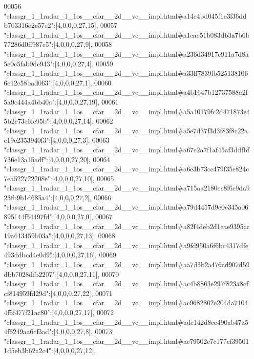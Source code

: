\begin{DoxyCode}
00056 \textcolor{stringliteral}{"classgr\_1\_1radar\_1\_1os\_\_cfar\_\_2d\_\_vc\_\_impl.html#a14e4bd045f1e3f36ddb703316e2e57e2"}:[4,0,0,0,27,15],
00057 \textcolor{stringliteral}{"classgr\_1\_1radar\_1\_1os\_\_cfar\_\_2d\_\_vc\_\_impl.html#a1cae51b083db3a7b6b77286d0ff987c5"}:[4,0,0,0,27,9],
00058 \textcolor{stringliteral}{"classgr\_1\_1radar\_1\_1os\_\_cfar\_\_2d\_\_vc\_\_impl.html#a236d34917c911a7d8a5e0c5fab9dc943"}:[4,0,0,0,27,4],
00059 \textcolor{stringliteral}{"classgr\_1\_1radar\_1\_1os\_\_cfar\_\_2d\_\_vc\_\_impl.html#a33ff7839fb5251381066e12e58bad063"}:[4,0,0,0,27,1],
00060 \textcolor{stringliteral}{"classgr\_1\_1radar\_1\_1os\_\_cfar\_\_2d\_\_vc\_\_impl.html#a4b1647b12737588a2f5a9c444a4bb40a"}:[4,0,0,0,27,19],
00061 \textcolor{stringliteral}{"classgr\_1\_1radar\_1\_1os\_\_cfar\_\_2d\_\_vc\_\_impl.html#a5a10179fc2d471873e45b2e73c6fc95b"}:[4,0,0,0,27,14],
00062 \textcolor{stringliteral}{"classgr\_1\_1radar\_1\_1os\_\_cfar\_\_2d\_\_vc\_\_impl.html#a5e7d37f3d3f83f8c22ac19e2353940f3"}:[4,0,0,0,27,3],
00063 \textcolor{stringliteral}{"classgr\_1\_1radar\_1\_1os\_\_cfar\_\_2d\_\_vc\_\_impl.html#a67e2a7f1af45af3ddfbf736e13a15adf"}:[4,0,0,0,27,20],
00064 \textcolor{stringliteral}{"classgr\_1\_1radar\_1\_1os\_\_cfar\_\_2d\_\_vc\_\_impl.html#a6e3b73cc479f35e824c7ea522722208e"}:[4,0,0,0,27,10],
00065 \textcolor{stringliteral}{"classgr\_1\_1radar\_1\_1os\_\_cfar\_\_2d\_\_vc\_\_impl.html#a715aa2180ec8f6c9da923fb9b1d685a4"}:[4,0,0,0,27,2],
00066 \textcolor{stringliteral}{"classgr\_1\_1radar\_1\_1os\_\_cfar\_\_2d\_\_vc\_\_impl.html#a79d4457d9c0e345a06895144f54497fd"}:[4,0,0,0,27,0],
00067 \textcolor{stringliteral}{"classgr\_1\_1radar\_1\_1os\_\_cfar\_\_2d\_\_vc\_\_impl.html#a82f4deb2d1eae9395cc19a613459b03a"}:[4,0,0,0,27,13],
00068 \textcolor{stringliteral}{"classgr\_1\_1radar\_1\_1os\_\_cfar\_\_2d\_\_vc\_\_impl.html#a9fd950a6f6bc4317dfe493ddbcd4e0d9"}:[4,0,0,0,27,16],
00069 \textcolor{stringliteral}{"classgr\_1\_1radar\_1\_1os\_\_cfar\_\_2d\_\_vc\_\_impl.html#aa7d3b2a476cd907d59dbb7028dfb2207"}:[4,0,0,0,27,11],
00070 \textcolor{stringliteral}{"classgr\_1\_1radar\_1\_1os\_\_cfar\_\_2d\_\_vc\_\_impl.html#ac4b8863e297f823a8cfcf814959fd29d"}:[4,0,0,0,27,22],
00071 \textcolor{stringliteral}{"classgr\_1\_1radar\_1\_1os\_\_cfar\_\_2d\_\_vc\_\_impl.html#ac9682802e204da71044f5f477f21ac80"}:[4,0,0,0,27,17],
00072 \textcolor{stringliteral}{"classgr\_1\_1radar\_1\_1os\_\_cfar\_\_2d\_\_vc\_\_impl.html#ade142d8ce490ab47a54f6249aa6cf3ad"}:[4,0,0,0,27,8],
00073 \textcolor{stringliteral}{"classgr\_1\_1radar\_1\_1os\_\_cfar\_\_2d\_\_vc\_\_impl.html#ae79502c7c177ef395011d5eb3b62a2c4"}:[4,0,0,0,27,12],

\end{DoxyCode}

